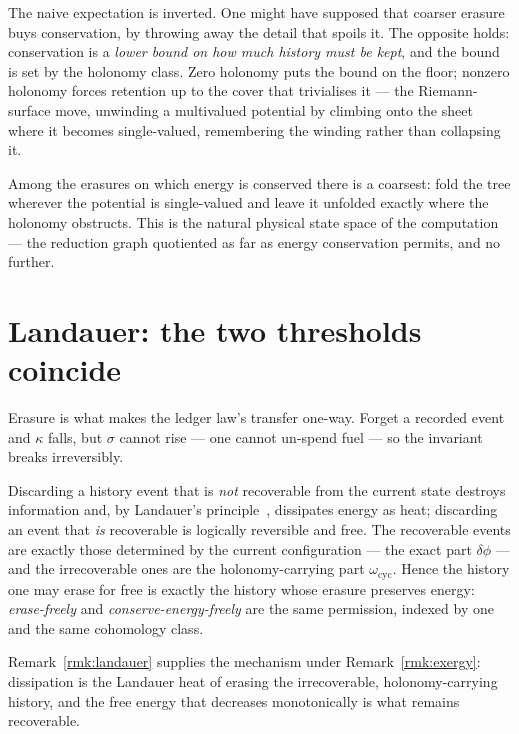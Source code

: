 The naive expectation is inverted.  One might have supposed that coarser
erasure buys conservation, by throwing away the detail that spoils it.
The opposite holds: conservation is a \emph{lower bound on how much
history must be kept}, and the bound is set by the holonomy class.  Zero
holonomy puts the bound on the floor; nonzero holonomy forces retention up
to the cover that trivialises it --- the Riemann-surface move, unwinding a
multivalued potential by climbing onto the sheet where it becomes
single-valued, remembering the winding rather than collapsing it.

\begin{corollary}
\label{cor:maximal}
Among the erasures on which energy is conserved there is a coarsest: fold
the tree wherever the potential is single-valued and leave it unfolded
exactly where the holonomy obstructs.  This is the natural physical state
space of the computation --- the reduction graph quotiented as far as
energy conservation permits, and no further.
\end{corollary}

\section{Landauer: the two thresholds coincide}

Erasure is what makes the ledger law's transfer one-way.  Forget a
recorded event and $\kappa$ falls, but $\sigma$ cannot rise --- one cannot
un-spend fuel --- so the invariant breaks irreversibly.

\begin{remark}
\label{rmk:landauer}
Discarding a history event that is \emph{not} recoverable from the current
state destroys information and, by Landauer's principle~\cite{Landauer},
dissipates energy as heat; discarding an event that \emph{is} recoverable
is logically reversible and free.  The recoverable events are exactly
those determined by the current configuration --- the exact part
$\delta\phi$ --- and the irrecoverable ones are the holonomy-carrying part
$\omega_{\mathrm{cyc}}$.  Hence the history one may erase for free is
exactly the history whose erasure preserves energy: \emph{erase-freely}
and \emph{conserve-energy-freely} are the same permission, indexed by one
and the same cohomology class.
\end{remark}

Remark~\ref{rmk:landauer} supplies the mechanism under
Remark~\ref{rmk:exergy}: dissipation is the Landauer heat of erasing the
irrecoverable, holonomy-carrying history, and the free energy that
decreases monotonically is what remains recoverable.

